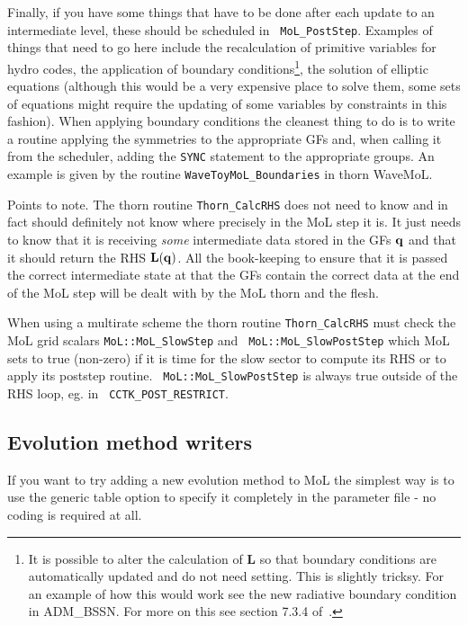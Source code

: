 Finally, if you have some things that have to be done after each
update to an intermediate level, these should be scheduled in {\tt
  MoL\_PostStep}. Examples of things that need to go here include the
recalculation of primitive variables for hydro codes, the application
of boundary conditions\footnote{It is possible to alter the
  calculation of {\bf L} so that boundary conditions are automatically
  updated and do not need setting. This is slightly tricksy. For an
  example of how this would work see the new radiative boundary
  condition in ADM\_BSSN. For more on this see section 7.3.4
  of~\cite{CactusBase_MoL_Thornburg93}.}, the solution of elliptic
equations (although this would be a very expensive place to solve
them, some sets of equations might require the updating of some
variables by constraints in this fashion). When applying boundary
conditions the cleanest thing to do is to write a routine applying the
symmetries to the appropriate GFs and, when calling it from the
scheduler, adding the {\tt SYNC} statement to the appropriate groups.
An example is given by the routine {\tt WaveToyMoL\_Boundaries} in
thorn WaveMoL.

Points to note. The thorn routine {\tt Thorn\_CalcRHS} does not need
to know and in fact should definitely not know where precisely in the
MoL step it is. It just needs to know that it is receiving {\it some}
intermediate data stored in the GFs ${\bf q}$ and that it should
return the RHS ${\bf L}({\bf q})$. All the book-keeping to ensure that
it is passed the correct intermediate state at that the GFs contain
the correct data at the end of the MoL step will be dealt with by the
MoL thorn and the flesh.

When using a multirate scheme the thorn routine {\tt Thorn\_CalcRHS} must
check the MoL grid scalars {\tt MoL::MoL\_SlowStep} and {\tt
MoL::MoL\_SlowPostStep} which MoL sets to true (non-zero) if it is time for
the slow sector to compute its RHS or to apply its poststep routine. {\tt
MoL::MoL\_SlowPostStep} is always true outside of the RHS loop, eg. in {\tt
CCTK\_POST\_RESTRICT}.

\subsection{Evolution method writers}
\label{CactusBase_MoL_sec:evol-meth-writ}

If you want to try adding a new evolution method to MoL the simplest
way is to use the generic table option to specify it completely in the
parameter file - no coding is required at all.


